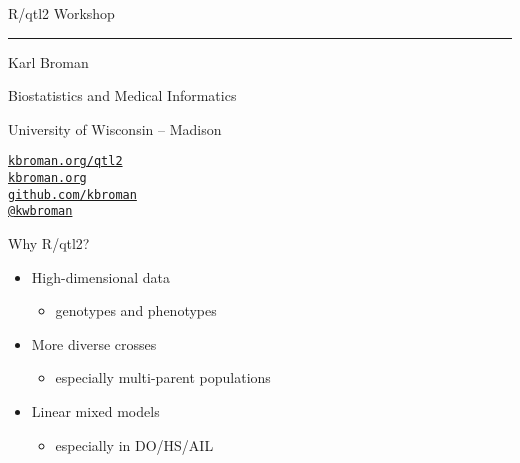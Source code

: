 \documentclass[12pt]{article}
\newcommand{\titlesize}{\fontsize{40}{50} \selectfont}
\newcommand{\headsize}{\fontsize{35}{35} \selectfont}
\newcommand{\textsize}{\fontsize{30}{35} \selectfont}
\newcommand{\smallsize}{\fontsize{25}{30} \selectfont}
\newcommand{\smallersize}{\fontsize{20}{25} \selectfont}
\begin{document}
\thispagestyle{empty}

\begin{center}
\titlesize \color{myyellow}


\vspace*{15mm}

R/qtl2 Workshop

\color{mypink}
\rule{10in}{1mm}

\vspace{5mm}

\textsize \color{myblue}
Karl Broman
\vspace{5mm}

\color{mywhite}
{\smallsize Biostatistics and Medical Informatics

University of Wisconsin -- Madison
\vspace{20mm}


\href{http://kbroman.org/qtl2}{\tt kbroman.org/qtl2} \\[3pt]
\href{http://kbroman.org}{\tt kbroman.org} \\[3pt]
\href{https://github.com/kbroman}{\tt github.com/kbroman} \\
\href{https://twitter.com/kwbroman}{\tt @kwbroman} \\
}

\end{center}

\newpage

\headsize \color{myyellow}
\hfill \begin{minipage}{5.75in}
\centering
Why R/qtl2?
\end{minipage}

\vspace{3cm}

\color{mywhite} \smallsize

\hfill \begin{minipage}[t]{9.5in}
\begin{itemize}
\itemsep24pt
\setlength{\rightskip}{0pt plus 1fil} %
\item High-dimensional data
  \begin{itemize}
  \item[] {\color{myblue} \smallersize genotypes and phenotypes}
  \end{itemize}
\item More diverse crosses
  \begin{itemize}
  \item[] {\color{myblue} \smallersize especially multi-parent populations}
  \end{itemize}
\item Linear mixed models
  \begin{itemize}
  \item[] {\color{myblue} \smallersize especially in DO/HS/AIL}
  \end{itemize}
\end{itemize} \end{minipage}
\end{document}
